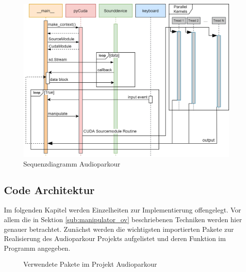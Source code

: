 \begin{figure}[hbt!]
	\centering      
	\includegraphics[scale=0.46, angle=-90]{figures/Soundmanipulator_sequence.png}
	\caption{Sequenzdiagramm Audioparkour}
	\label{fig:Seq_soundManipulator}
\end{figure}

\subsection{Code Architektur}

Im folgenden Kapitel werden Einzelheiten zur Implementierung offengelegt. Vor allem die in Sektion \ref{sub:manipulator_ov} beschriebenen Techniken werden hier genauer betrachtet. Zunächst werden die wichtigsten importierten Pakete zur Realisierung des Audioparkour Projekts aufgelistet und deren Funktion im Programm angegeben.

\begin{figure}[h!]
	
	\caption{Verwendete Pakete im Projekt Audioparkour}
	\label{fig:audioparkour_packages}
\end{figure}

